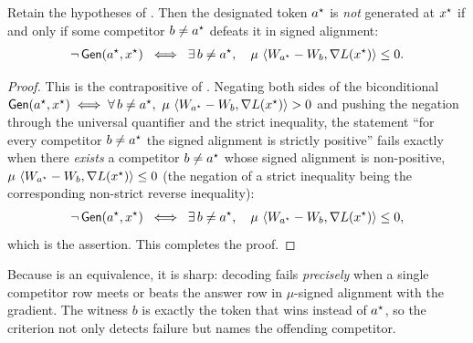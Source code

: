 \begin{corollary}
\label{cor:fail}
Retain the hypotheses of . Then the designated token $a^{\star}$ is \emph{not}
generated at $x^{\star}$ if and only if some competitor $b \ne a^{\star}$ defeats it in signed
alignment:
\begin{align*}
\neg\,\mathsf{Gen}(a^{\star}, x^{\star})
\;\iff\;
\exists\, b \ne a^{\star},\quad \mu\,\left\langle W_{a^{\star}} - W_{b}, \nabla L(x^{\star}) \right\rangle \le 0.
\end{align*}
\end{corollary}

\begin{proof}
This is the contrapositive of . Negating both sides of the biconditional
$\mathsf{Gen}(a^{\star}, x^{\star}) \iff \forall\, b \ne a^{\star},\ \mu\,\left\langle W_{a^{\star}} - W_{b}, \nabla L(x^{\star}) \right\rangle > 0$
and pushing the negation through the universal quantifier and the strict inequality, the
statement ``for every competitor $b \ne a^{\star}$ the signed alignment is strictly positive''
fails exactly when there \emph{exists} a competitor $b \ne a^{\star}$ whose signed alignment is
non-positive, $\mu\,\left\langle W_{a^{\star}} - W_{b}, \nabla L(x^{\star}) \right\rangle \le 0$ (the negation of a
strict inequality being the corresponding non-strict reverse inequality):
\begin{align*}
\neg\,\mathsf{Gen}(a^{\star}, x^{\star})
\;\iff\;
\exists\, b \ne a^{\star},\quad \mu\,\left\langle W_{a^{\star}} - W_{b}, \nabla L(x^{\star}) \right\rangle \le 0,
\end{align*}
which is the assertion. This completes the proof.
\end{proof}

\begin{remark}
\label{rem:fail-tight}
Because  is an equivalence, it is sharp: decoding fails \emph{precisely} when a
single competitor row meets or beats the answer row in $\mu$-signed alignment with the
gradient. The witness $b$ is exactly the token that wins instead of $a^{\star}$, so the criterion
not only detects failure but names the offending competitor.
\end{remark}

